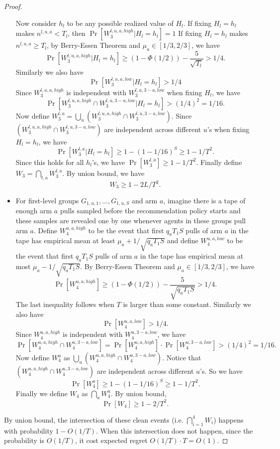 \begin{proof}
\begin{itemize}
Now consider $h_l$ to be any possible realized value of $H_l$. If fixing $H_l= h_l$ makes $n^{l,u,a}<T_l$, then $\Pr[W_3^{l,u,a,high} |H_l = h_l]=1$  If fixing $H_l = h_l$ makes $n^{l,u,a} \geq T_l$, by Berry-Essen Theorem and $\mu_a \in [1/3,2/3]$, we have
\[
\Pr[W_3^{l,u,a,high}|H_l = h_l] \geq (1-\Phi(1/2)) - \frac{5}{\sqrt{T_l}} > 1/4.
\]
Similarly we also have
\[
\Pr[W_3^{l,u,a,low}|H_l = h_l]  > 1/4
\]
Since $W_3^{l,u,a,high}$ is independent with $W_3^{l,u,3-a,low}$ when fixing $H_l$, we have
\[
\Pr[ W_3^{l,u,a,high} \cap W_3^{l,u,3-a,low}|H_l = h_l]  > (1/4)^2 = 1/16.
\]
Now define $W_3^{l,a} = \bigcup_u (W_3^{l,u,a,high} \cap W_3^{l,u,3-a,low})$. Since  $(W_3^{l,u,a,high} \cap W_3^{l,u,3-a,low})$ are independent across different $u$'s when fixing $H_l=h_l$, we have
\[
\Pr[W_3^{l,a}|H_l= h_l] \geq 1- (1-1/16)^S \geq 1 - 1/T^2.
\]
Since this holds for all $h_l$'s, we have $\Pr[W_3^{l,a}] \geq 1-1/T^2$. Finally define $W_3 = \bigcap_{l,a} W_3^{l,a}$. By union bound, we have
\[
W_3 \geq 1 - 2L/T^2.
\]

\item For first-level groups $G_{1,u,1},...,G_{1,u,S}$ and arm $a$, imagine there is a tape of enough arm $a$ pulls sampled before the recommendation policy starts and these samples are revealed one by one whenever agents in these groups pull arm $a$. Define $W_4^{u,a,high}$  to be the event that first $q_a T_1 S$ pulls of arm $a$ in the tape has empirical mean at least $\mu_a + 1/\sqrt{q_a T_1 S}$ and define $W_4^{u,a,low}$  to be the event that first $q_a T_1S$ pulls of arm $a$ in the tape has empirical mean at most $\mu_a - 1/\sqrt{q_a T_1S }$. By Berry-Essen Theorem and $\mu_a \in [1/3,2/3]$, we have
\[
\Pr[W_4^{u,a,high}] \geq (1-\Phi(1/2)) - \frac{5}{\sqrt{q_aT_1S}} > 1/4.
\]
The last inequality follows when $T$ is larger than some constant.
Similarly we also have 
\[
\Pr[W_4^{u,a,low}] > 1/4.
\]
Since $W_4^{u,a,high}$ is independent with $W_4^{u,3-a,low}$, we have
\[
\Pr[W_4^{u,a,high} \cap W_4^{u,3-a,low}] =\Pr[W_4^{u,a,high}] \cdot  \Pr[W_4^{u,3-a,low}]>(1/4)^2 = 1/16.
\]
Now define $W^{a}_4$ as $\bigcup_u (W_4^{u,a,high} \cap W_4^{u,3-a,low})$. Notice that $(W_4^{u,a,high} \cap W_4^{u,3-a,low})$ are independent across different $u$'s. So we have
\[
\Pr[W^{a}_4] \geq 1- (1-1/16)^S \geq 1 -1/T^2.
\]
Finally we define $W_4$ as $\bigcap_{a} W^{a}_4$. By union bound,
\[
\Pr[W_4] \geq 1- 2/T^2.
\]
\end{itemize}

By union bound, the intersection of these clean events (i.e. $\bigcap_{i=1}^4 W_i$) happens with probability $1-O(1/T)$. When this intersection does not happen, since the probability is $O(1/T)$, it cost expected regret $O(1/T) \cdot T = O(1)$. 


\end{proof}
